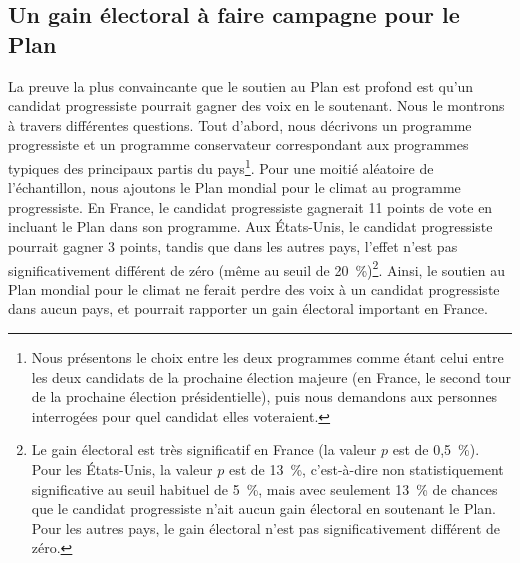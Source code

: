 \documentclass[a5paper,french]{memoir}
\begin{document}
\subsection{Un gain électoral à faire campagne pour le Plan}
La preuve la plus convaincante que le soutien au Plan est profond est qu'un candidat progressiste pourrait gagner des voix en le soutenant. Nous le montrons à travers différentes questions. Tout d'abord, nous décrivons un programme progressiste et un programme conservateur correspondant aux programmes typiques des principaux partis du pays\footnote{Nous présentons le choix entre les deux programmes comme étant celui entre les deux candidats de la prochaine élection majeure (en France, le second tour de la prochaine élection présidentielle), puis nous demandons aux personnes interrogées pour quel candidat elles voteraient.}. Pour une moitié aléatoire de l'échantillon, nous ajoutons le Plan mondial pour le climat au programme progressiste. En France, le candidat progressiste gagnerait 11 points de vote en incluant le Plan dans son programme. Aux États-Unis, le candidat progressiste pourrait gagner 3 points, tandis que dans les autres pays, l'effet n'est pas significativement différent de zéro (même au seuil de 20~\%)\footnote{Le gain électoral est très significatif en France (la valeur $p$ est de 0,5~\%). Pour les États-Unis, la valeur $p$ est de 13~\%, c'est-à-dire non statistiquement significative au seuil habituel de 5~\%, mais avec seulement 13~\% de chances que le candidat progressiste n'ait aucun gain électoral en soutenant le Plan. Pour les autres pays, le gain électoral n'est pas significativement différent de zéro.}. 
%
Ainsi, le soutien au Plan mondial pour le climat ne ferait perdre des voix à un candidat progressiste dans aucun pays, et pourrait rapporter un gain électoral important en France. 
\end{document}
